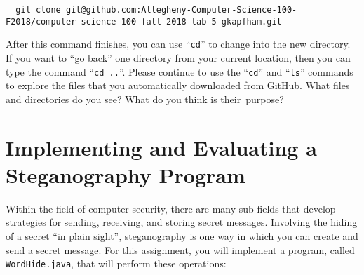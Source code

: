 \documentclass[11pt]{article}
\newcommand{\command}[1]{``\lstinline{#1}''}
\newcommand{\step}[1]{``{#1}''}
\begin{document}
\begin{lstlisting}
  git clone git@github.com:Allegheny-Computer-Science-100-F2018/computer-science-100-fall-2018-lab-5-gkapfham.git
\end{lstlisting}

After this command finishes, you can use \command{cd} to change into the new
directory. If you want to \step{go back} one directory from your current
location, then you can type the command \command{cd ..}. Please continue to use
the \command{cd} and \command{ls} commands to explore the files that you
automatically downloaded from GitHub. What files and directories do you see?
What do you think is \mbox{their purpose}?


\section*{Implementing and Evaluating a Steganography Program}

Within the field of computer security, there are many sub-fields that develop
strategies for sending, receiving, and storing secret messages. Involving the
hiding of a secret ``in plain sight'', steganography is one way in which you can
create and send a secret message. For this assignment, you will implement a
program, called {\tt WordHide.java}, that will perform these operations:

\vspace*{-.1in}
\end{document}
